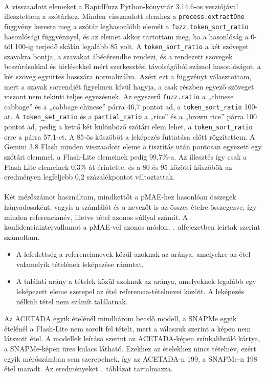 \paragraph{}A visszaadott elemeket a RapidFuzz Python-könyvtár 3.14.6-os verziójával 
illesztettem a szótárhoz. Minden visszaadott elemhez a \texttt{process.extractOne} függvény 
kereste meg a szótár leghasonlóbb elemét a \texttt{fuzz.token\_sort\_ratio} hasonlósági 
függvénnyel, és az elemet akkor tartottam meg, ha a hasonlóság a 0-tól 100-ig terjedő skálán 
legalább 85 volt. A \texttt{token\_sort\_ratio} a két szöveget szavakra bontja, a szavakat 
ábécérendbe rendezi, és a rendezett szövegek beszúrásokkal és törlésekkel mért szerkesztési 
távolságából számol hasonlóságot, a két szöveg együttes hosszára normalizálva. Azért ezt a 
függvényt választottam, mert a szavak sorrendjét figyelmen kívül hagyja, a csak részben egyező 
szöveget viszont nem tekinti teljes egyezésnek. Az egyszerű \texttt{fuzz.ratio} a „chinese 
cabbage” és a „cabbage chinese” párra 46,7 pontot ad, a \texttt{token\_sort\_ratio} 100-at. A 
\texttt{token\_set\_ratio} és a \texttt{partial\_ratio} a „rice” és a „brown rice” párra 100 
pontot ad, pedig a kettő két különböző szótári elem lehet, a \texttt{token\_sort\_ratio} erre a 
párra 57,1-et. A 85-ös küszöböt a leképezés futtatása előtt rögzítettem. A Gemini 3.8 Flash 
minden visszaadott eleme a tisztítás után pontosan egyezett egy szótári elemmel, a Flash-Lite 
elemeinek pedig 99,7\%-a. Az illesztés így csak a Flash-Lite elemeinek 0,3\%-át érintette, és a 
80 és 95 közötti küszöbök az eredményen legfeljebb 0,2 százalékpontot változtattak.

\paragraph{}Két mérőszámot használtam, mindkettőt a pMAE-hez hasonlóan összegek hányadosaként, vagyis a 
számlálót és a nevezőt is az összes ételre összegezve, így minden referencianév, illetve tétel azonos 
súllyal számít. A konfidenciaintervallumot a pMAE-vel azonos módon, \az{\ref{sec:ertekeles}}.~alfejezetben 
leírtak szerint számoltam.
\begin{itemize}
    \item A lefedettség a referencianevek közül azoknak az aránya, amelyekre az étel valamelyik 
    tételének leképezése rámutat.
    \item A találati arány a tételek közül azoknak az aránya, amelyeknek legalább egy leképezett 
    eleme szerepel az étel referencia-tételnevei között. A leképezés nélküli tétel nem számít 
    találatnak.
\end{itemize}
Az ACETADA egyik ételénél mindhárom becslő modell, a SNAPMe egyik ételénél a Flash-Lite nem 
sorolt fel tételt, mert a válaszuk szerint a képen nem látszott étel. A modellek leírása 
szerint az ACETADA-képen színkalibráló kártya, a SNAPMe-képen üres kulacs látható. Ezekhez az ételekhez nincs tételnév, 
ezért egyik mérőszámban sem szerepelnek, így az ACETADA-n 199, a SNAPMe-n 198 étel maradt. Az 
eredményeket \az{\ref{tab:felismeres}}.~táblázat tartalmazza.

